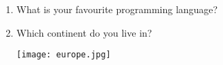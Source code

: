 \documentclass[12pt,onside,a4paper,article]{memoir}
\newcommand\blankpage{%
    \null
    \thispagestyle{empty}%
    \addtocounter{page}{-1}%
    \newpage}
\begin{document}
\begin{enumerate}
\begin{flushright}
\end{flushright}

\item{What is your favourite programming language?}
\begin{flushright}
\vspace{3cm}

\end{flushright}

\item{Which continent do you live in?}
\begin{flushright}
\vspace{3cm}

\end{flushright}
\begin{flushleft}
\texttt{[image: europe.jpg]}
\end{flushleft}
\end{enumerate}

\vspace*{4.5cm}
\begin{flushright}
\end{flushright}
\clearpage
\blankpage
\end{document}
